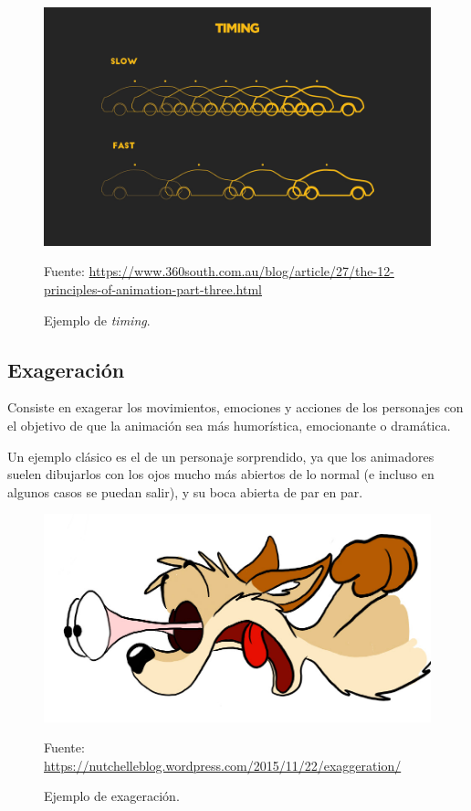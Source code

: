 \documentclass{article}
\begin{document}
\begin{figure}[H]
    \centering
    \includegraphics[width=\textwidth]{imagenes/image-9_timing.jpg}
    \caption{Ejemplo de \textit{timing}.}
    \vspace{10pt}
    \footnotesize{Fuente: \url{https://www.360south.com.au/blog/article/27/the-12-principles-of-animation-part-three.html}}
\end{figure}

\subsection{Exageración}

Consiste en exagerar los movimientos, emociones y acciones de los personajes con el objetivo de que la animación sea más humorística, emocionante o dramática.

\bigskip

Un ejemplo clásico es el de un personaje sorprendido, ya que los animadores suelen dibujarlos con los ojos mucho más abiertos de lo normal (e incluso en algunos casos se puedan salir), y su boca abierta de par en par.

\begin{figure}[H]
    \centering
    \includegraphics[width=\textwidth]{imagenes/080104_eyes.jpg}
    \caption{Ejemplo de exageración.}
    \vspace{10pt}
    \footnotesize{Fuente: \url{https://nutchelleblog.wordpress.com/2015/11/22/exaggeration/}}
\end{figure}
\end{document}
